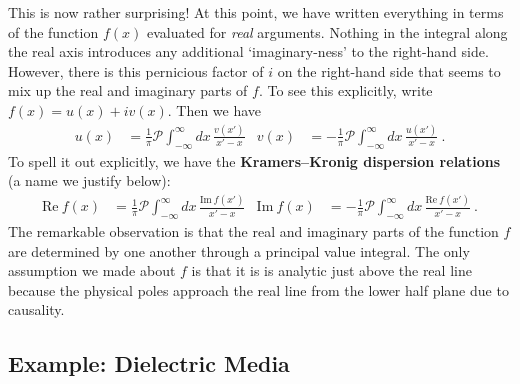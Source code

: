 This is now rather surprising! At this point, we have written everything in terms of the function $f(x)$ evaluated for \emph{real} arguments. Nothing in the integral along the real axis introduces any additional `imaginary-ness' to the right-hand side. However, there is this pernicious factor of $i$ on the right-hand side that seems to mix up the real and imaginary parts of $f$. To see this explicitly, write $f(x) = u(x) + i v(x)$. Then we have
\begin{align}
	u(x) &= \frac{1}{\pi}
	\mathcal P \int_{-\infty}^\infty dx 
		\, \frac{v(x')}{x'-x} 
		&
	v(x) &= -\frac{1}{\pi}
	\mathcal P \int_{-\infty}^\infty dx 
		\, \frac{u(x')}{x'-x} 
	\ .
\end{align}
To spell it out explicitly, we have the \textbf{Kramers--Kronig dispersion relations} (a name we justify below):
\begin{align}
	\text{Re}~f(x) &= \frac{1}{\pi}
	\mathcal P \int_{-\infty}^\infty dx 
		\, \frac{\text{Im}~f(x')}{x'-x} 
		&
	\text{Im}~f(x) &= -\frac{1}{\pi}
	\mathcal P \int_{-\infty}^\infty dx 
		\, \frac{\text{Re}~f(x')}{x'-x} 
	\ .
\end{align}
The remarkable observation is that the real and imaginary parts of the function $f$ are determined by one another through a principal value integral. The only assumption we made about $f$ is that it is is analytic just above the real line because the physical poles approach the real line from the lower half plane due to causality.

\subsection{Example: Dielectric Media}







